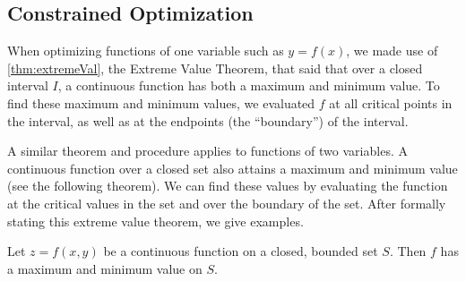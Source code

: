 \subsection*{Constrained Optimization}

When optimizing functions of one variable such as $y=f(x)$, we made use of \autoref{thm:extremeVal}, the Extreme Value Theorem, that said that over a closed interval $I$, a continuous function has both a maximum and minimum value. To find these maximum and minimum values, we evaluated $f$ at all critical points in the interval, as well as at the endpoints (the ``boundary'') of the interval.

A similar theorem and procedure applies to functions of two variables. A continuous function over a closed set also attains a maximum and minimum value (see the following theorem). We can find these values by evaluating the function at the critical values in the set and over the boundary of the set. After formally stating this extreme value theorem, we give examples.

{Let $z=f(x,y)$ be a continuous function on a closed, bounded set $S$. Then $f$ has a maximum and minimum value on $S$.
}


